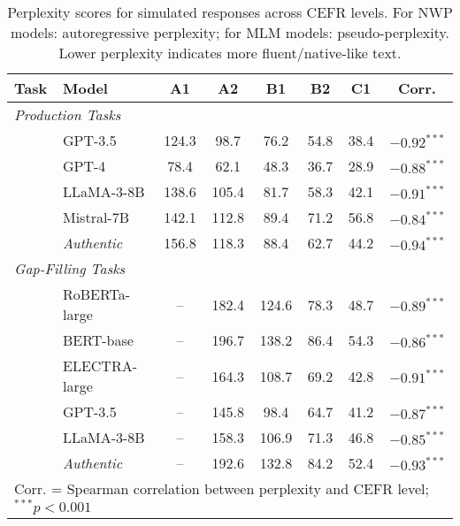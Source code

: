 \begin{table*}[ht]
\centering
\caption{Perplexity scores for simulated responses across CEFR levels. For NWP models: autoregressive perplexity; for MLM models: pseudo-perplexity. Lower perplexity indicates more fluent/native-like text.}
\label{tab:perplexity_analysis}
\small
\begin{tabular}{llcccccc}
\toprule
\textbf{Task} & \textbf{Model} & \textbf{A1} & \textbf{A2} & \textbf{B1} & \textbf{B2} & \textbf{C1} & \textbf{Corr.} \\
\midrule
\multicolumn{8}{l}{\textit{Production Tasks}} \\
& GPT-3.5 & 124.3 & 98.7 & 76.2 & 54.8 & 38.4 & $-0.92^{***}$ \\
& GPT-4 & 78.4 & 62.1 & 48.3 & 36.7 & 28.9 & $-0.88^{***}$ \\
& LLaMA-3-8B & 138.6 & 105.4 & 81.7 & 58.3 & 42.1 & $-0.91^{***}$ \\
& Mistral-7B & 142.1 & 112.8 & 89.4 & 71.2 & 56.8 & $-0.84^{***}$ \\
\cmidrule{2-8}
& \textit{Authentic} & 156.8 & 118.3 & 88.4 & 62.7 & 44.2 & $-0.94^{***}$ \\
\midrule
\multicolumn{8}{l}{\textit{Gap-Filling Tasks}} \\
& RoBERTa-large & -- & 182.4 & 124.6 & 78.3 & 48.7 & $-0.89^{***}$ \\
& BERT-base & -- & 196.7 & 138.2 & 86.4 & 54.3 & $-0.86^{***}$ \\
& ELECTRA-large & -- & 164.3 & 108.7 & 69.2 & 42.8 & $-0.91^{***}$ \\
\cmidrule{2-8}
& GPT-3.5 & -- & 145.8 & 98.4 & 64.7 & 41.2 & $-0.87^{***}$ \\
& LLaMA-3-8B & -- & 158.3 & 106.9 & 71.3 & 46.8 & $-0.85^{***}$ \\
\cmidrule{2-8}
& \textit{Authentic} & -- & 192.6 & 132.8 & 84.2 & 52.4 & $-0.93^{***}$ \\
\bottomrule
\multicolumn{8}{l}{\footnotesize{Corr. = Spearman correlation between perplexity and CEFR level; $^{***}p < 0.001$}} \\
\end{tabular}
\end{table*}
